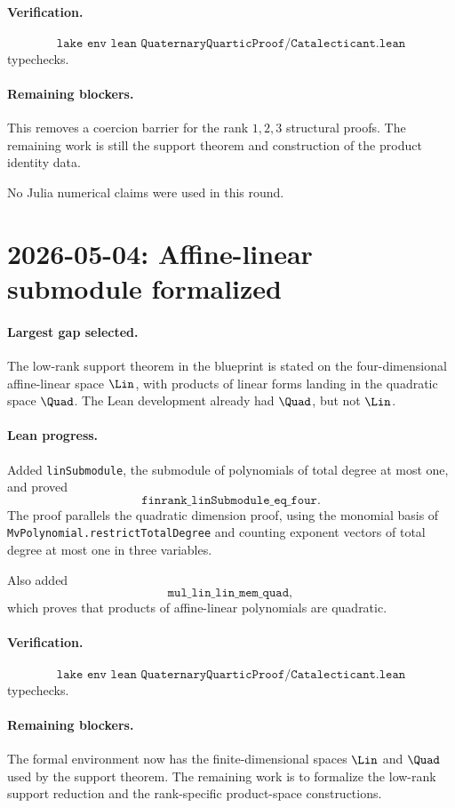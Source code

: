 \documentclass[11pt]{article}
\begin{document}
\paragraph{Verification.}
\[
\texttt{lake env lean QuaternaryQuarticProof/Catalecticant.lean}
\]
typechecks.

\paragraph{Remaining blockers.}
This removes a coercion barrier for the rank \(1,2,3\) structural proofs.  The
remaining work is still the support theorem and construction of the product
identity data.

No Julia numerical claims were used in this round.

\section*{2026-05-04: Affine-linear submodule formalized}

\paragraph{Largest gap selected.}
The low-rank support theorem in the blueprint is stated on the
four-dimensional affine-linear space \(\Lin\), with products of linear forms
landing in the quadratic space \(\Quad\).  The Lean development already had
\(\Quad\), but not \(\Lin\).

\paragraph{Lean progress.}
Added \texttt{linSubmodule}, the submodule of polynomials of total degree at
most one, and proved
\[
\texttt{finrank\_linSubmodule\_eq\_four}.
\]
The proof parallels the quadratic dimension proof, using the monomial basis of
\texttt{MvPolynomial.restrictTotalDegree} and counting exponent vectors of
total degree at most one in three variables.

Also added
\[
\texttt{mul\_lin\_lin\_mem\_quad},
\]
which proves that products of affine-linear polynomials are quadratic.

\paragraph{Verification.}
\[
\texttt{lake env lean QuaternaryQuarticProof/Catalecticant.lean}
\]
typechecks.

\paragraph{Remaining blockers.}
The formal environment now has the finite-dimensional spaces \(\Lin\) and
\(\Quad\) used by the support theorem.  The remaining work is to formalize the
low-rank support reduction and the rank-specific product-space constructions.
\end{document}
